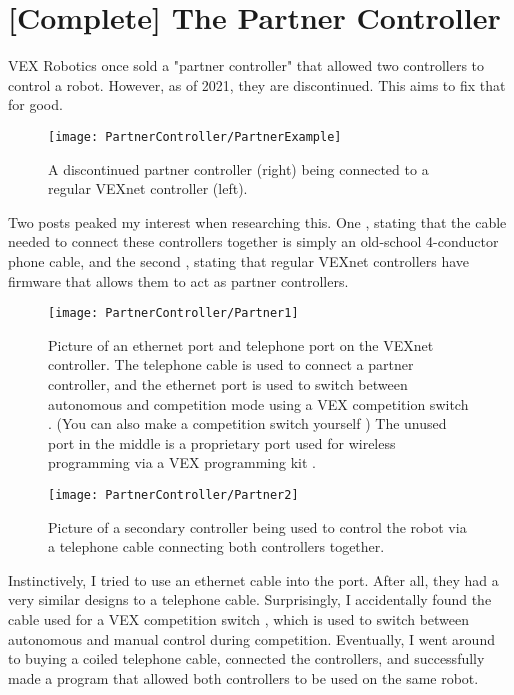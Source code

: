 \section{[Complete] The Partner Controller}

VEX Robotics once sold a "partner controller" that allowed two controllers to control a robot. However, as of 2021, they are discontinued. This aims to fix that for good.

\begin{figure}[h]
    \centering
    \texttt{[image: PartnerController/PartnerExample]}
    \caption{
        A discontinued partner controller (right) being connected to a regular VEXnet controller (left).
    }
\end{figure}

Two posts peaked my interest when researching this. One \cite{PartnerCite2}, stating that the cable needed to connect these controllers together is simply an old-school 4-conductor phone cable, and the second \cite{PartnerCite1}, stating that regular VEXnet controllers have firmware that allows them to act as partner controllers.

\begin{figure}[h]
    \centering
    \texttt{[image: PartnerController/Partner1]}
    \caption{
        Picture of an ethernet port and telephone port on the VEXnet controller. The telephone cable is used to connect a partner controller, and the ethernet port is used to switch between autonomous and competition mode using a VEX competition switch \cite{VEXCompSwitch}. (You can also make a competition switch yourself \cite{VEXDIYCompSwitch}) The unused port in the middle is a proprietary port used for wireless programming via a VEX programming kit \cite{VEXProgrammingKit}.
    }
\end{figure}


\begin{figure}[h]
    \centering
    \texttt{[image: PartnerController/Partner2]}
    \caption{
        Picture of a secondary controller being used to control the robot via a telephone cable connecting both controllers together.
    }
\end{figure}

Instinctively, I tried to use an ethernet cable into the port. After all, they had a very similar designs to a telephone cable. Surprisingly, I accidentally found the cable used for a VEX competition switch \cite{VEXCompSwitch}, which is used to switch between autonomous and manual control during competition. Eventually, I went around to buying a coiled telephone cable, connected the controllers, and successfully made a program that allowed both controllers to be used on the same robot.
